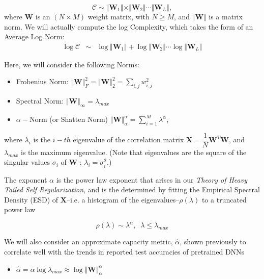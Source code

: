 \begin{equation}
\mathcal{C}\sim\Vert\mathbf{W}_{1}\Vert\times\Vert\mathbf{W}_{2}\Vert\cdots\Vert\mathbf{W}_{L}\Vert ,
\end{equation}
where $\mathbf{W}$ is an $(N\times M)$ weight matrix, with $N\ge M$, and 
 $\Vert\mathbf{W}\Vert$ is a matrix norm.   We will actually compute the log Complexity, which takes the form 
of an Average Log Norm:
\begin{eqnarray*}
\log\mathcal{C} &\sim& \log\Vert\mathbf{W}_{1}\Vert+\log\Vert\mathbf{W}_{2}\Vert\cdots\log\Vert\mathbf{W}_{L}\Vert
\end{eqnarray*}

Here, we will consider the following Norms:

\begin{itemize}
 \item Frobenius Norm: $\Vert\mathbf{W}\Vert^{2}_{F}=\Vert\mathbf{W}\Vert^{2}_{2}=\sum_{i,j}w^{2}_{i,j}$
 \item Spectral Norm:  $\Vert\mathbf{W}\Vert_{\infty}=\lambda_{max}$
 \item $\alpha-$Norm (or Shatten Norm) $\Vert\mathbf{W}\Vert^{\alpha}_{\alpha}=\sum_{i=1}^{M}\lambda^{\alpha}$,
\end{itemize}

where $\lambda_{i}$ is the $i-th$ eigenvalue of the correlation matrix $\mathbf{X}=\dfrac{1}{N}\mathbf{W}^{T}\mathbf{W}$, and $\lambda_{max}$ is the maximum eigenvalue.   (Note that eigenvalues are the square of the singular values $\sigma_{i}$ of $\mathbf{W}$ :  $\lambda_{i}=\sigma^{2}_{i}$.)

The exponent $\alpha$ is the power law exponent that arises in our \emph{Theory of Heavy Tailed Self Regularization}, and is the determined by fitting the Empirical Spectral Density (ESD) of $\mathbf{X}$--i.e. a histogram of the eigenvalues--$\rho(\lambda)$ to a truncated power law

\begin{equation}
\rho(\lambda)\sim\lambda^{\alpha},\;\;\lambda\le\lambda_{max}
\end{equation}

We will also consider an approximate capacity metric, $\hat{\alpha}$, shown previously to correlate well with the trends in reported test accuracies of pretrained DNNs \cite{MM}

\begin{itemize}
 \item $\hat{\alpha}=\alpha\log\lambda_{max}\approx\log\Vert\mathbf{W}\Vert^{\alpha}_{\alpha}$
\end{itemize}

